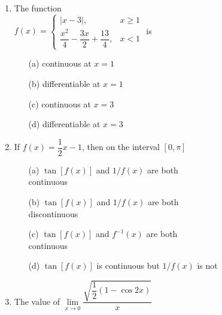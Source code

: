 \documentclass[journal,12pt,twocolumn]{IEEEtran}
\begin{document}
\begin{enumerate}
\item The function \\$f(x)=\begin{cases}
|x-3|, & \text{$x\geq 1$}\\
\dfrac{x^2}{4}-\dfrac{3x}{2}+\dfrac{13}{4}, & \text{$x < 1$}
\end{cases}$ is\\
\begin{itemize}
\item[(a)] continuous at $x=1$ \item[(b)] differentiable at $x=1$ \item[(c)] continuous at $x=3$ \item[(d)] differentiable at $x=3$
\end{itemize}

\item If $f(x)=\dfrac{1}{2}x-1$, then on the interval $[0,\pi]$
\begin{itemize}
\item[(a)] $\tan[f(x)]$ and $1/f(x)$ are both\\ continuous
\item[(b)] $\tan[f(x)]$ and $1/f(x)$ are both\\ discontinuous
\item[(c)] $\tan[f(x)]$ and $f^{-1}(x)$ are both\\ continuous
\item[(d)] $\tan[f(x)]$ is continuous but $1/f(x)$ is not
\end{itemize}

\item The value of $\lim\limits_{x \to 0}\dfrac{\sqrt{\dfrac{1}{2}(1-\cos 2x)}}{x}$
\begin{itemize}
\end{itemize}


\end{enumerate}
\end{document}
